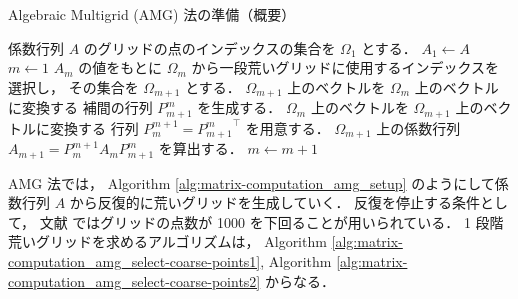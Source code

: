 \begin{algorithm}[tp]
    \caption{Algebraic Multigrid (AMG) 法の準備（概要） \cite{Ruge1987,Wolters2002}}
    \label{alg:matrix-computation_amg_setup}
    \begin{algorithmic}
        \State 係数行列 $A$ のグリッドの点のインデックスの集合を $\Omega_1$ とする．
        \State $A_1 \gets A$
        \State $m \gets 1$
        \Loop
        \State $A_m$ の値をもとに $\Omega_m$ から一段荒いグリッドに使用するインデックスを選択し，
        その集合を $\Omega_{m+1}$ とする．
        \State $\Omega_{m+1}$ 上のベクトルを $\Omega_{m}$ 上のベクトルに変換する
        補間の行列 $P_{m+1}^{m}$ を生成する．
        \State $\Omega_{m}$ 上のベクトルを $\Omega_{m+1}$ 上のベクトルに変換する
        行列 $P_{m}^{m+1} = {P_{m+1}^{m}}^\top$ を用意する．
        \State $\Omega_{m+1}$ 上の係数行列 $A_{m+1} = P_{m}^{m+1} A_{m} P_{m+1}^{m}$ を算出する．
        \State \Return
        \EndIf
        \State $m \gets m + 1$
        \EndLoop
        \EndProcedure
    \end{algorithmic}
\end{algorithm}

AMG 法では，
Algorithm \ref{alg:matrix-computation_amg_setup}
のようにして係数行列 $A$ から反復的に荒いグリッドを生成していく．
反復を停止する条件として，
文献 \cite{Wolters2002} ではグリッドの点数が 1000 を下回ることが用いられている．
1 段階荒いグリッドを求めるアルゴリズムは，
Algorithm \ref{alg:matrix-computation_amg_select-coarse-points1},
Algorithm \ref{alg:matrix-computation_amg_select-coarse-points2}
からなる．

